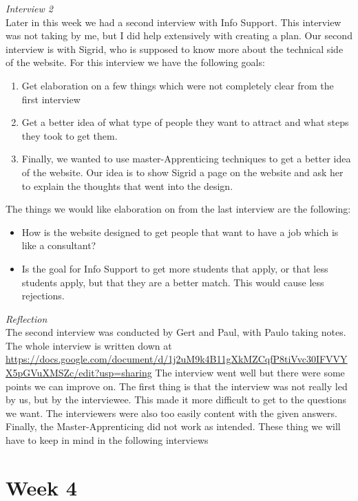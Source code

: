 \documentclass[]{article}
\begin{document}
\noindent\textit{Interview 2}\\
Later in this week we had a second interview with Info Support. This interview 
was not taking by me, but I did help extensively with creating a plan. Our second 
interview is with Sigrid, who is supposed to know more about the technical side 
of the website. For this interview we have the following goals:
\begin{enumerate}
    \item Get elaboration on a few things which were not completely clear from the 
    first interview
    \item Get a better idea of what type of people they want to attract and 
    what steps they took to get them. 
    \item Finally, we wanted to use master-Apprenticing techniques to get a better
    idea of the website. Our idea is to show Sigrid a page on the website and 
    ask her to explain the thoughts that went into the design.
\end{enumerate}

The things we would like elaboration on from the last interview are the following:
\begin{itemize}
    \item How is the website designed to get people that want to have a job which 
    is like a consultant?
    \item Is the goal for Info Support to get more students that apply, or that 
    less students apply, but that they are a better match. This would cause less 
    rejections. 
\end{itemize}

\noindent\textit{Reflection}\\
The second interview was conducted by Gert and Paul, with Paulo taking notes.
The whole interview is written down at \url{https://docs.google.com/document/d/1j2uM9k4B11gXkMZCqfP8tiVvc30IFVVYX5pGVuXMSZc/edit?usp=sharing}
The interview went well but there were some points we can improve on. The first 
thing is that the interview was not really led by us, but by the interviewee. 
This made it more difficult to get to the questions we want. The interviewers
were also too easily content with the given answers. Finally, the Master-Apprenticing
did not work as intended. These thing we will have to keep in mind in the following 
interviews


\section*{Week 4}
\end{document}
